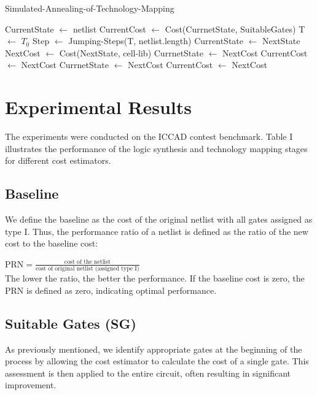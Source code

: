\documentclass[conference]{IEEEtran}
\begin{document}
\begin{algorithm}
\begin{algorithmic}[1]
    \caption{Simulated-Annealing-of-Technology-Mapping}\label{euclid}
    \State CurrentState $\gets$ netlist
    \State CurrentCost $\gets$ Cost(CurrnetState, SuitableGates)
    \State T $\gets$ $T_0$
        \State Step $\gets$ Jumping-Steps(T, netlist.length)
            \State CurrentState $\gets$ NextState
        \EndFor
        \State NextCost $\gets$ Cost(NextState, cell-lib)
            \State CurrnetState $\gets$ NextCost
            \State CurrentCost $\gets$ NextCost
            \State CurrnetState $\gets$ NextCost
            \State CurrentCost $\gets$ NextCost
        \EndIf
    \EndWhile
\end{algorithmic}
\end{algorithm}

\section{Experimental Results}
The experiments were conducted on the ICCAD contest benchmark. Table I illustrates the performance of the logic synthesis and technology mapping stages for different cost estimators.


\subsection{Baseline}
We define the baseline as the cost of the original netlist with all gates assigned as type I. Thus, the performance ratio of a netlist is defined as the ratio of the new cost to the baseline cost:

$\text{PRN} = \frac{\text{cost of the netlist}}{\text{cost of original netlist (assigned type I)}}$ \\
 
The lower the ratio, the better the performance. If the baseline cost is zero, the PRN is defined as zero, indicating optimal performance.

\subsection{Suitable Gates (SG)}
As previously mentioned, we identify appropriate gates at the beginning of the process by allowing the cost estimator to calculate the cost of a single gate. This assessment is then applied to the entire circuit, often resulting in significant improvement.
\end{document}
